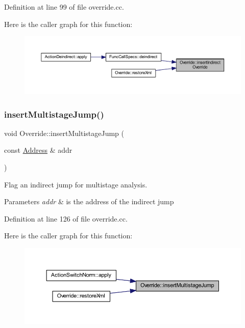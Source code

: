 Definition at line 99 of file override.\+cc.

Here is the caller graph for this function\+:
\nopagebreak
\begin{figure}[H]
\begin{center}
\leavevmode
\includegraphics[width=350pt]{class_override_a244525d6ba415aab3769255c79ab7ba8_icgraph}
\end{center}
\end{figure}
\mbox{\label{class_override_a0922bffef45d1f3916dd63b12ace98ec}} 
\subsubsection{\texorpdfstring{insertMultistageJump()}{insertMultistageJump()}}
{\footnotesize\ttfamily void Override\+::insert\+Multistage\+Jump (\begin{DoxyParamCaption}\item[{const \mbox{\hyperlink{class_address}{Address}} \&}]{addr }\end{DoxyParamCaption})}



Flag an indirect jump for multistage analysis. 


\begin{DoxyParams}{Parameters}
{\em addr} & is the address of the indirect jump \\
\hline
\end{DoxyParams}


Definition at line 126 of file override.\+cc.

Here is the caller graph for this function\+:
\nopagebreak
\begin{figure}[H]
\begin{center}
\leavevmode
\includegraphics[width=350pt]{class_override_a0922bffef45d1f3916dd63b12ace98ec_icgraph}
\end{center}
\end{figure}
\mbox{\label{class_override_abf08af570f603eaf60f36f61c3a275ae}} 
